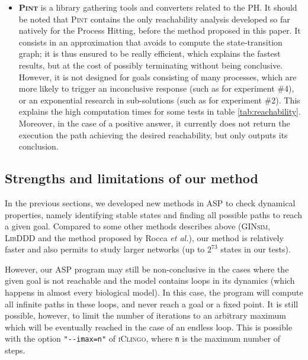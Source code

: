 \begin{itemize}
\item \textbf{\textsc{Pint}}
is a library gathering tools and converters related to the PH.
It should be noted that \textsc{Pint} contains the only reachability analysis
developed so far natively for the Process Hitting,
before the method proposed in this paper.
It consists in an approximation that avoids to compute the state-transition graph;
it is thus ensured to be really efficient, which explains the fastest results,
but at the cost of possibly terminating without being conclusive.
However, it is not designed for goals consisting of many processes,
which are more likely to trigger an inconclusive response
(such as for experiment \#4),
or an exponential research in sub-solutions
(such as for experiment \#2).
This explains the high computation times for some tests in table \ref{tab:reachability}.
Moreover, in the case of a positive answer,
it currently does not return the execution the path achieving the desired reachability,
but only outputs its conclusion.
\end{itemize}

\subsection{Strengths and limitations of our method}
\label{limitations}

In the previous sections,
we developed new methods in ASP to check dynamical properties,
namely identifying stable states and finding all possible paths to reach a given goal.
Compared to some other methods describes above
(\textsc{GINsim}, \textsc{LibDDD} and the method proposed by Rocca \textit{et al.}),
our method is relatively faster and also permits to study larger networks
(up to $2^{73}$ states in our tests).

However, our ASP program may still be non-conclusive
in the cases where the given goal is not
reachable and the model contains loops in its dynamics
(which happens in almost every biological model).
In this case, the program will compute all infinite paths in these loops,
and never reach a goal or a fixed point.
It is still possible, however, to limit the number of iterations to an arbitrary
maximum which will be eventually reached in the case of an endless loop.
This is possible with the option \texttt{"-{}-imax=n"} of \textsc{iClingo},
where \texttt{n} is the maximum number of steps.

